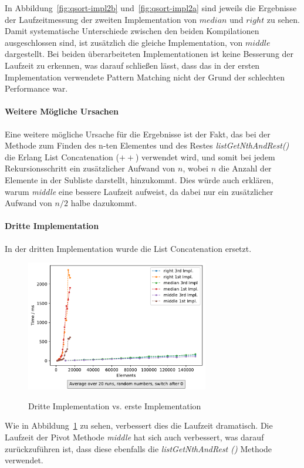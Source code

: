 In Abbildung~\ref{fig:qsort-impl2b} und~\ref{fig:qsort-impl2a} sind jeweils die
Ergebnisse der Laufzeitmessung der zweiten Implementation von \(median\) und
\(right\) zu sehen.
Damit systematische Unterschiede zwischen den beiden Kompilationen
ausgeschlossen sind, ist zusätzlich die gleiche Implementation, von \(middle\)
dargestellt.
Bei beiden überarbeiteten Implementationen ist keine Besserung der Laufzeit zu
erkennen, was darauf schließen lässt, dass das in der ersten Implementation
verwendete Pattern Matching nicht der Grund der schlechten Performance war.

\paragraph{Weitere Mögliche Ursachen}
Eine weitere mögliche Ursache für die Ergebnisse ist der Fakt, das bei der
Methode zum Finden des n-ten Elementes und des Restes
\textit{listGetNthAndRest()} die Erlang List Concatenation (\(++\)) verwendet
wird, und somit bei jedem Rekursionsschritt ein zusätzlicher Aufwand von
\(n\), wobei \(n\) die Anzahl der Elemente in der Subliste darstellt,
hinzukommt.
Dies würde auch erklären, warum \textit{middle} eine bessere Laufzeit
aufweist, da dabei nur ein zusätzlicher Aufwand von \(n/2\) halbe dazukommt.

\paragraph{Dritte Implementation}
In der dritten Implementation wurde die List Concatenation ersetzt.

\begin{figure}[hbt]
    \centering
    \caption{Dritte Implementation vs. erste Implementation}
    \includegraphics[width=8cm]
    {../out/pivotMethods_Implementation3.pdf}\label{fig:qsort-impl3}
\end{figure}

Wie in Abbildung~\ref{fig:qsort-impl3} zu sehen,
verbessert dies die Laufzeit dramatisch.
Die Laufzeit der Pivot Methode \textit{middle} hat sich auch verbessert, was
darauf zurückzuführen ist, dass diese ebenfalls die \textit{listGetNthAndRest
()} Methode verwendet.

